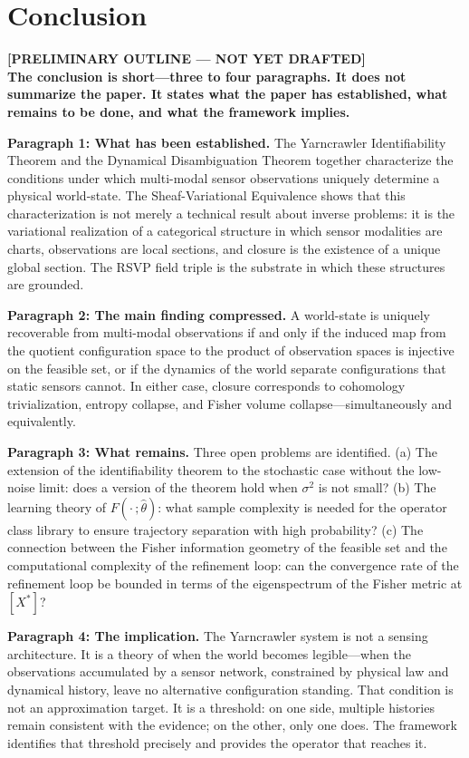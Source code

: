 \documentclass[12pt, oneside]{article}
\newcommand{\preliminary}[1]{%
  \colorbox{yellow!20}{\parbox{\dimexpr\linewidth-2\fboxsep}{%
    \textbf{\textcolor{red!70!black}{[PRELIMINARY OUTLINE --- NOT YET DRAFTED]}}\\[4pt]
    #1
  }}%
}
\begin{document}
\section{Conclusion}
\label{sec:conclusion}

\preliminary{
\textbf{The conclusion is short---three to four paragraphs. It does not summarize the
paper. It states what the paper has established, what remains to be done, and what the
framework implies.}

\medskip
\textbf{Paragraph 1: What has been established.}
The Yarncrawler Identifiability Theorem and the Dynamical Disambiguation Theorem together
characterize the conditions under which multi-modal sensor observations uniquely determine
a physical world-state. The Sheaf-Variational Equivalence shows that this characterization
is not merely a technical result about inverse problems: it is the variational realization
of a categorical structure in which sensor modalities are charts, observations are local
sections, and closure is the existence of a unique global section. The RSVP field triple
is the substrate in which these structures are grounded.

\medskip
\textbf{Paragraph 2: The main finding compressed.}
A world-state is uniquely recoverable from multi-modal observations if and only if the
induced map from the quotient configuration space to the product of observation spaces is
injective on the feasible set, or if the dynamics of the world separate configurations
that static sensors cannot. In either case, closure corresponds to cohomology
trivialization, entropy collapse, and Fisher volume collapse---simultaneously and
equivalently.

\medskip
\textbf{Paragraph 3: What remains.}
Three open problems are identified. (a) The extension of the identifiability theorem to
the stochastic case without the low-noise limit: does a version of the theorem hold when
$\sigma^2$ is not small? (b) The learning theory of $F(\cdot\,;\hat{\theta})$: what
sample complexity is needed for the operator class library to ensure trajectory separation
with high probability? (c) The connection between the Fisher information geometry of the
feasible set and the computational complexity of the refinement loop: can the convergence
rate of the refinement loop be bounded in terms of the eigenspectrum of the Fisher metric
at $[X^*]$?

\medskip
\textbf{Paragraph 4: The implication.}
The Yarncrawler system is not a sensing architecture. It is a theory of when the world
becomes legible---when the observations accumulated by a sensor network, constrained by
physical law and dynamical history, leave no alternative configuration standing. That
condition is not an approximation target. It is a threshold: on one side, multiple
histories remain consistent with the evidence; on the other, only one does. The framework
identifies that threshold precisely and provides the operator that reaches it.
}
\end{document}
